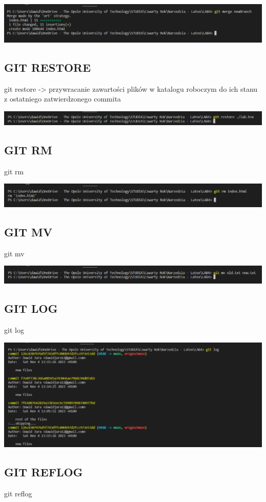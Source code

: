 \documentclass{article} %
\newcommand{\forceindent}{\leavevmode{\parindent=1cm\indent}} %
\begin{document}
\includegraphics[width=18cm]{image/merge.png}
\subsection{GIT RESTORE}
\forceindent git restore -> przywracanie zawartości plików w katalogu roboczym do ich stanu z ostatniego zatwierdzonego commita

\includegraphics[width=18cm]{image/restore.png}
\subsection{GIT RM}
\forceindent git rm

\includegraphics[width=18cm]{image/rm.png}
\subsection{GIT MV}
\forceindent git mv

\includegraphics[width=18cm]{image/mv.png}
\subsection{GIT LOG}
\forceindent git log

\includegraphics[width=18cm]{image/log.png}
\subsection{GIT REFLOG}
\forceindent git reflog
\end{document}
